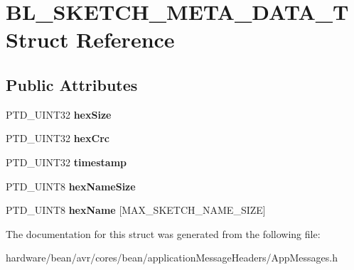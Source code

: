 \hypertarget{struct_b_l___s_k_e_t_c_h___m_e_t_a___d_a_t_a___t}{}\section{B\+L\+\_\+\+S\+K\+E\+T\+C\+H\+\_\+\+M\+E\+T\+A\+\_\+\+D\+A\+T\+A\+\_\+\+T Struct Reference}
\label{struct_b_l___s_k_e_t_c_h___m_e_t_a___d_a_t_a___t}
\subsection*{Public Attributes}
\begin{DoxyCompactItemize}
\item 
\hypertarget{struct_b_l___s_k_e_t_c_h___m_e_t_a___d_a_t_a___t_a9e51f84ff4b61da949d9d08efe5633a7}{}P\+T\+D\+\_\+\+U\+I\+N\+T32 {\bfseries hex\+Size}\label{struct_b_l___s_k_e_t_c_h___m_e_t_a___d_a_t_a___t_a9e51f84ff4b61da949d9d08efe5633a7}

\item 
\hypertarget{struct_b_l___s_k_e_t_c_h___m_e_t_a___d_a_t_a___t_a4baaf0e3cba8d7e1d7200a32531f3db4}{}P\+T\+D\+\_\+\+U\+I\+N\+T32 {\bfseries hex\+Crc}\label{struct_b_l___s_k_e_t_c_h___m_e_t_a___d_a_t_a___t_a4baaf0e3cba8d7e1d7200a32531f3db4}

\item 
\hypertarget{struct_b_l___s_k_e_t_c_h___m_e_t_a___d_a_t_a___t_a2650b9923e0acb1cdb4ebef3541657c5}{}P\+T\+D\+\_\+\+U\+I\+N\+T32 {\bfseries timestamp}\label{struct_b_l___s_k_e_t_c_h___m_e_t_a___d_a_t_a___t_a2650b9923e0acb1cdb4ebef3541657c5}

\item 
\hypertarget{struct_b_l___s_k_e_t_c_h___m_e_t_a___d_a_t_a___t_a9f08c868a16dac0f0430c9115d817178}{}P\+T\+D\+\_\+\+U\+I\+N\+T8 {\bfseries hex\+Name\+Size}\label{struct_b_l___s_k_e_t_c_h___m_e_t_a___d_a_t_a___t_a9f08c868a16dac0f0430c9115d817178}

\item 
\hypertarget{struct_b_l___s_k_e_t_c_h___m_e_t_a___d_a_t_a___t_a17019df0616eba02dd2fc22402740ba6}{}P\+T\+D\+\_\+\+U\+I\+N\+T8 {\bfseries hex\+Name} \mbox{[}M\+A\+X\+\_\+\+S\+K\+E\+T\+C\+H\+\_\+\+N\+A\+M\+E\+\_\+\+S\+I\+Z\+E\mbox{]}\label{struct_b_l___s_k_e_t_c_h___m_e_t_a___d_a_t_a___t_a17019df0616eba02dd2fc22402740ba6}

\end{DoxyCompactItemize}


The documentation for this struct was generated from the following file\+:\begin{DoxyCompactItemize}
\item 
hardware/bean/avr/cores/bean/application\+Message\+Headers/App\+Messages.\+h\end{DoxyCompactItemize}
